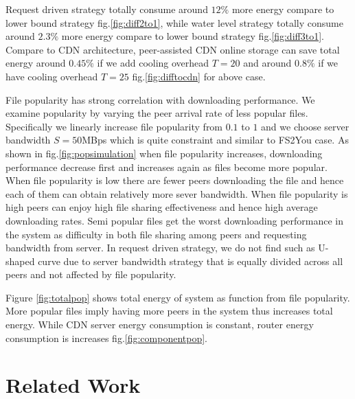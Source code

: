 \documentclass[conference]{IEEEtran}
\begin{document}
Request driven strategy totally consume around $12\%$ more energy compare to lower bound strategy fig.\ref{fig:diff2to1}, while water level strategy totally consume around $2.3\%$ more energy compare to lower bound strategy fig.\ref{fig:diff3to1}.
Compare to CDN architecture, peer-assisted CDN online storage can save total energy around $0.45\%$ if we add cooling overhead $T=20$ and around $0.8\%$ if we have cooling overhead $T=25$ fig.\ref{fig:difftocdn} for above case. 

File popularity has strong correlation with downloading performance. 
We examine popularity by varying the peer arrival rate of less popular files.
Specifically we linearly increase file popularity from $0.1$ to $1$ and we choose server bandwidth $S=50$MBps which is quite constraint and similar to FS2You case.
As shown in fig.\ref{fig:popsimulation} when file popularity increases, downloading performance decrease first and increases again as files become more popular.
When file popularity is low there are fewer peers downloading the file and hence each of them can obtain relatively more sever bandwidth.
When file popularity is high peers can enjoy high file sharing effectiveness and hence high average downloading rates.
Semi popular files get the worst downloading performance in the system as difficulty in both file sharing among peers and requesting bandwidth from server.
In request driven strategy, we do not find such as U-shaped curve due to server bandwidth strategy that is equally divided across all peers and not affected by file popularity.

Figure \ref{fig:totalpop} shows total energy of system as function from file popularity.  
More popular files imply having more peers in the system thus increases total energy.  
While CDN server energy consumption is constant, router energy consumption is increases fig.\ref{fig:componentpop}. 



\section{Related Work} 
\end{document}
